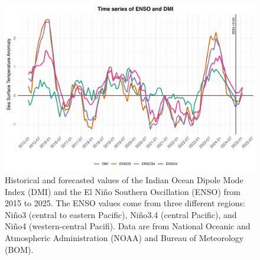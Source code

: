 \documentclass[
]{book}
\begin{document}
\begin{figure}

{\centering \includegraphics[width=1\linewidth]{figures/climate_data_ENSO_weekly} 

}

\caption{Historical and forecasted values of the Indian Ocean Dipole Mode Index (DMI) and the El Niño Southern Oscillation (ENSO) from 2015 to 2025. The ENSO values come from three different regions: Niño3 (central to eastern Pacific), Niño3.4 (central Pacific), and Niño4 (western-central Pacifi). Data are from National Oceanic and Atmospheric Administration (NOAA) and Bureau of Meteorology (BOM).}\label{fig:climate-data-enso}
\end{figure}
\end{document}
